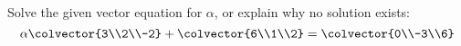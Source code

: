 Solve the given vector equation for $\alpha$, or explain why no solution exists:
%
\begin{equation*}
\alpha\colvector{3\\2\\-2}+
\colvector{6\\1\\2}
=
\colvector{0\\-3\\6}
\end{equation*}
%
